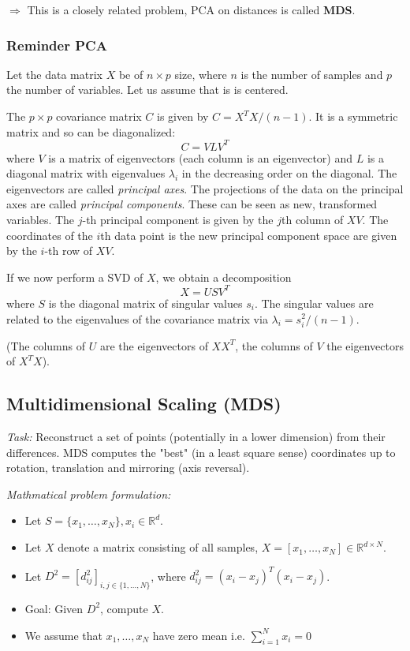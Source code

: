 \documentclass{scrartcl}
\begin{document}
\(\Rightarrow\) This is a closely related problem, PCA on distances is called \textbf{MDS}.

\subsubsection{Reminder PCA}
Let the data matrix \(X\) be of \(n \times p\) size, where \(n\) is the number of samples and \(p\) the number of variables. Let us assume that is is centered.

The \(p \times p\) covariance matrix \(C\) is given by \(C = X^T X/(n-1)\). It is a symmetric matrix and so can be diagonalized:
\[C = V L V^T\]
where \(V\) is a matrix of eigenvectors (each column is an eigenvector) and \(L\) is a diagonal matrix with eigenvalues \(\lambda_i\) in the decreasing order on the diagonal. The eigenvectors are called \textit{principal axes}. The projections of the data on the principal axes are called \textit{principal components}. These can be seen as new, transformed variables. The \(j\)-th principal component is given by the \(j\)th column of \(XV\). The coordinates of the \(i\)th data point is the new principal component space are given by the \(i\)-th row of \(XV\).

If we now perform a SVD of \(X\), we obtain a decomposition 
\[X = U S V^T\]
where \(S\) is the diagonal matrix of singular values \(s_i\). The singular values are related to the eigenvalues of the covariance matrix via \(\lambda_i = s_i^2/(n-1)\). 

(The columns of \(U\) are the eigenvectors of \(XX^T\), the columns of \(V\) the eigenvectors of \(X^TX\)).

\subsection{Multidimensional Scaling (MDS)}
\textit{Task:} Reconstruct a set of points (potentially in a lower dimension) from their differences. MDS computes the "best" (in a least square sense) coordinates up to rotation, translation and mirroring (axis reversal).

\textit{Mathmatical problem formulation:}
\begin{itemize}
    \item
        Let \(S = \{x_1, \dots, x_N\}, x_i \in \mathbb{R}^d\). 
    \item
        Let \(X\) denote a matrix consisting of all samples, \(X=[x_1, \dots, x_N] \in \mathbb{R}^{d \times N}\).
    \item
        Let \(D^2 = [d_{ij}^2]_{i, j \in \{1, \dots, N\}}\), where \(d_{ij}^2 = (x_i - x_j)^T (x_i - x_j)\). 
    \item
        Goal: Given \(D^2\), compute \(X\).
    \item
        We assume that \(x_1, \dots, x_N\) have zero mean i.e. \(\sum_{i=1}^N x_i = 0\)
\end{itemize}
\end{document}
